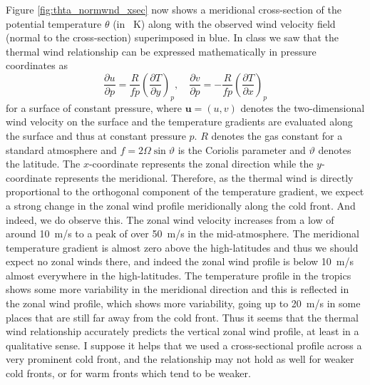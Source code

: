 \documentclass[11pt]{article}
\newcommand\p[2]{\frac{\partial #1}{\partial #2}}
\begin{document}
Figure \ref{fig:thta_normwnd_xsec} now shows a meridional cross-section of the potential temperature $\theta$ (in \SI{}{\K}) along with the observed wind velocity field (normal to the cross-section) superimposed in blue. In class we saw that the thermal wind relationship can be expressed mathematically in pressure coordinates as
\begin{equation}
	\p{u}{p} = \frac{R}{fp} \left( \p{T}{y} \right)_p, \quad \p{v}{p} = -\frac{R}{fp} \left( \p{T}{x} \right)_p
\end{equation}
for a surface of constant pressure, where $\bm{u} = (u,v)$ denotes the two-dimensional wind velocity on the surface and the temperature gradients are evaluated along the surface and thus at constant pressure $p$. $R$ denotes the gas constant for a standard atmosphere and $f = 2\Omega\sin\vartheta$ is the Coriolis parameter and $\vartheta$ denotes the latitude. The $x$-coordinate represents the zonal direction while the $y$-coordinate represents the meridional. Therefore, as the thermal wind is directly proportional to the orthogonal component of the temperature gradient, we expect a strong change in the zonal wind profile meridionally along the cold front. And indeed, we do observe this. The zonal wind velocity increases from a low of around \SI{10}{\m/\s} to a peak of over \SI{50}{\m/\s} in the mid-atmosphere. The meridional temperature gradient is almost zero above the high-latitudes and thus we should expect no zonal winds there, and indeed the zonal wind profile is below \SI{10}{\m/\s} almost everywhere in the high-latitudes. The temperature profile in the tropics shows some more variability in the meridional direction and this is reflected in the zonal wind profile, which shows more variability, going up to \SI{20}{\m/\s} in some places that are still far away from the cold front. Thus it seems that the thermal wind relationship accurately predicts the vertical zonal wind profile, at least in a qualitative sense. I suppose it helps that we used a cross-sectional profile across a very prominent cold front, and the relationship may not hold as well for weaker cold fronts, or for warm fronts which tend to be weaker.
\end{document}
